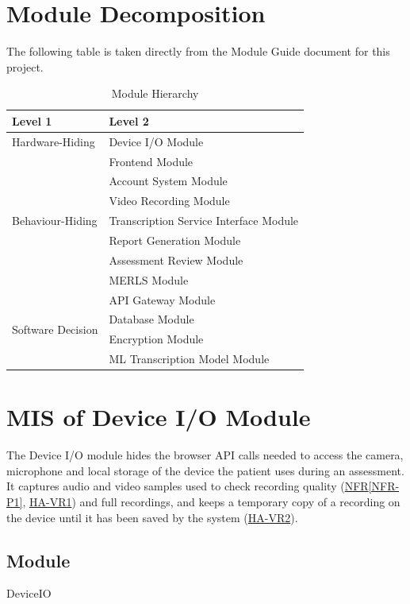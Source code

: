 \documentclass[12pt, titlepage]{article}
\newcommand{\srsref}[2]{\href{https://github.com/Nour-Fawaz/MacaBoca/blob/main/pdfs/SRS/SRS.pdf}{#1\ref*{#2}}}
\newcommand{\hazref}[1]{\href{https://github.com/Nour-Fawaz/MacaBoca/blob/main/pdfs/HazardAnalysis/HazardAnalysis.pdf}{#1}}
\begin{document}
\section{Module Decomposition} \label{Module_Decomp}

The following table is taken directly from the Module Guide document for this project.
\begin{table}[h!]
\centering
\begin{tabular}{p{} p{}}
\toprule
\textbf{Level 1} & \textbf{Level 2}\\
\midrule

{Hardware-Hiding} & Device I/O Module \\
\midrule

\multirow{7}{0.3\textwidth}{Behaviour-Hiding} & Frontend Module\\
& Account System Module\\
& Video Recording Module\\
& Transcription Service Interface Module\\
& Report Generation Module\\
& Assessment Review Module\\
& MERLS Module\\
\midrule

\multirow{4}{0.3\textwidth}{Software Decision} & API Gateway Module\\
& Database Module\\
& Encryption Module\\
& ML Transcription Model Module\\
\bottomrule

\end{tabular}
\caption{Module Hierarchy}
\label{TblMH}
\end{table}


\newpage
\section{MIS of Device I/O Module}\label{DeviceIO}
The Device I/O module hides the browser API calls needed to
access the camera, microphone and local storage of the device the patient uses
during an assessment. It captures audio and video samples used to check
recording quality (\srsref{NFR}{NFR-P1}, \hazref{HA-VR1}) and full
recordings, and keeps a temporary copy of a recording on the device until it
has been saved by the system (\hazref{HA-VR2}).

\subsection{Module}
DeviceIO
\end{document}
